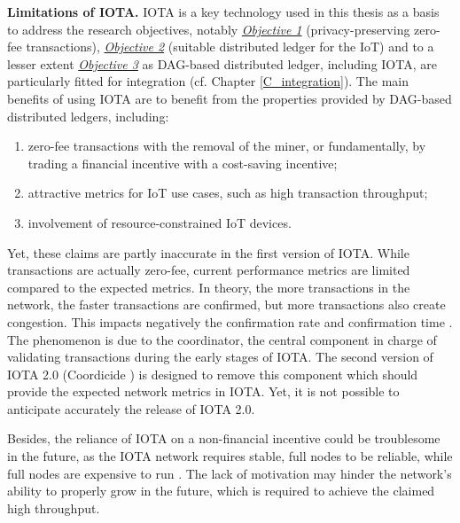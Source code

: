 \textbf{Limitations of IOTA.}
IOTA is a key technology used in this thesis as a basis to address the research objectives, notably \hyperref[obj:1]{\emph{Objective 1}} (privacy-preserving zero-fee transactions), \hyperref[obj:23]{\emph{Objective 2}} (suitable distributed ledger for the IoT) and to a lesser extent \hyperref[obj:23]{\emph{Objective 3}} as DAG-based distributed ledger, including IOTA, are particularly fitted for integration (cf. Chapter \ref{C_integration}).
The main benefits of using IOTA are to benefit from the properties provided by DAG-based distributed ledgers, including:
\begin{enumerate}
    \item zero-fee transactions with the removal of the miner, or fundamentally, by trading a financial incentive with a cost-saving incentive;
    \item attractive metrics for IoT use cases, such as high transaction throughput;
    \item involvement of resource-constrained IoT devices.
\end{enumerate}

Yet, these claims are partly inaccurate in the first version of IOTA. While transactions are actually zero-fee, current performance metrics are limited compared to the expected metrics. In theory, the more transactions in the network, the faster transactions are confirmed, but more transactions also create congestion. This impacts negatively the confirmation rate and confirmation time \cite{Dong2019}. The phenomenon is due to the coordinator, the central component in charge of validating transactions during the early stages of IOTA. The second version of IOTA 2.0 (Coordicide \cite{Popov2020}) is designed to remove this component which should provide the expected network metrics in IOTA. Yet, it is not possible to anticipate accurately the release of IOTA 2.0.

Besides, the reliance of IOTA on a non-financial incentive could be troublesome in the future, as the IOTA network requires stable, full nodes to be reliable, while full nodes are expensive to run \cite{Dong2019}. The lack 
of motivation may hinder the network's ability to properly grow in the future, which is required to achieve the claimed high throughput.

